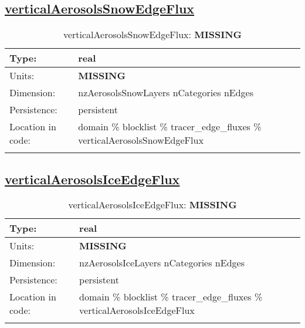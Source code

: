 \subsection[verticalAerosolsSnowEdgeFlux]{\hyperref[sec:var_tab_tracer_edge_fluxes]{verticalAerosolsSnowEdgeFlux}}
\label{subsec:var_sec_tracer_edge_fluxes_verticalAerosolsSnowEdgeFlux}
\begin{center}
\begin{longtable}{| p{2.0in} | p{4.0in} |}
        \hline 
        Type: & real \\
        \hline 
        Units: & {\bf \color{red} MISSING} \\
        \hline 
        Dimension: & nzAerosolsSnowLayers nCategories nEdges \\
        \hline 
        Persistence: & persistent \\
        \hline 
         Location in code: & domain \% blocklist \% tracer\_edge\_fluxes \% verticalAerosolsSnowEdgeFlux \\
         \hline 
    \caption{verticalAerosolsSnowEdgeFlux: {\bf \color{red} MISSING}}
\end{longtable}
\end{center}
\subsection[verticalAerosolsIceEdgeFlux]{\hyperref[sec:var_tab_tracer_edge_fluxes]{verticalAerosolsIceEdgeFlux}}
\label{subsec:var_sec_tracer_edge_fluxes_verticalAerosolsIceEdgeFlux}
\begin{center}
\begin{longtable}{| p{2.0in} | p{4.0in} |}
        \hline 
        Type: & real \\
        \hline 
        Units: & {\bf \color{red} MISSING} \\
        \hline 
        Dimension: & nzAerosolsIceLayers nCategories nEdges \\
        \hline 
        Persistence: & persistent \\
        \hline 
         Location in code: & domain \% blocklist \% tracer\_edge\_fluxes \% verticalAerosolsIceEdgeFlux \\
         \hline 
    \caption{verticalAerosolsIceEdgeFlux: {\bf \color{red} MISSING}}
\end{longtable}
\end{center}
